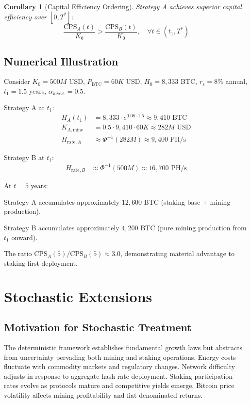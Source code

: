 \documentclass[
  journal=medium,
  manuscript=article-type,
  year=2025,
  volume=1,
]{cup-journal}
\newtheorem{corollary}[theorem]{Corollary}
\theoremstyle{definition}
\begin{document}
\begin{corollary}[Capital Efficiency Ordering]
Strategy A achieves superior capital efficiency over $[0, T^*]$:
\begin{equation}
\frac{\text{CPS}_A(t)}{K_0} > \frac{\text{CPS}_B(t)}{K_0}, \quad \forall t \in (t_1, T^*)
\end{equation}
\end{corollary}

\subsection{Numerical Illustration}

Consider $K_0 = 500M$ USD, $P_{\text{BTC}} = 60K$ USD, $H_0 = 8,333$ BTC, $r_s = 8\%$ annual, $t_1 = 1.5$ years, $\alpha_{\text{invest}} = 0.5$.

Strategy A at $t_1$:
\begin{align}
H_A(t_1) &= 8,333 \cdot e^{0.08 \cdot 1.5} \approx 9,410 \text{ BTC} \\
K_{A,\text{mine}} &= 0.5 \cdot 9,410 \cdot 60K \approx 282M \text{ USD} \\
H_{\text{rate},A} &\approx \Phi^{-1}(282M) \approx 9,400 \text{ PH/s}
\end{align}

Strategy B at $t_1$:
\begin{align}
H_{\text{rate},B} &\approx \Phi^{-1}(500M) \approx 16,700 \text{ PH/s}
\end{align}

At $t = 5$ years:

Strategy A accumulates approximately $12,600$ BTC (staking base + mining production).

Strategy B accumulates approximately $4,200$ BTC (pure mining production from $t_1$ onward).

The ratio $\text{CPS}_A(5) / \text{CPS}_B(5) \approx 3.0$, demonstrating material advantage to staking-first deployment.

\section{Stochastic Extensions}

\subsection{Motivation for Stochastic Treatment}

The deterministic framework establishes fundamental growth laws but abstracts from uncertainty pervading both mining and staking operations. Energy costs fluctuate with commodity markets and regulatory changes. Network difficulty adjusts in response to aggregate hash rate deployment. Staking participation rates evolve as protocols mature and competitive yields emerge. Bitcoin price volatility affects mining profitability and fiat-denominated returns.
\end{document}
